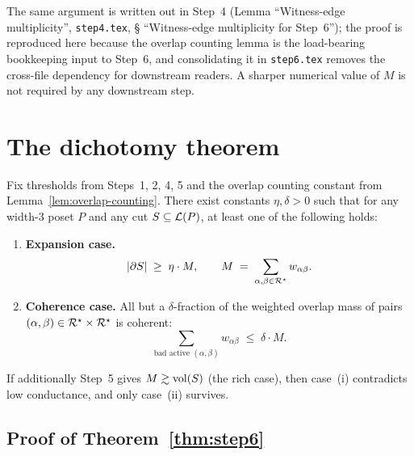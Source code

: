 \begin{remark}
The same argument is written out in Step~4
(Lemma ``Witness-edge multiplicity'', \texttt{step4.tex}, \S
``Witness-edge multiplicity for Step~6''); the proof is reproduced
here because the overlap counting lemma is the load-bearing bookkeeping
input to Step~6, and consolidating it in \texttt{step6.tex} removes the
cross-file dependency for downstream readers.  A sharper numerical
value of $M$ is not required by any downstream step.
\end{remark}

\section{The dichotomy theorem}\label{sec:dichotomy-theorem}

\begin{theorem}\label{thm:step6}
Fix thresholds from Steps~1, 2, 4, 5 and the overlap counting constant
from Lemma~\ref{lem:overlap-counting}.
There exist constants $\eta,\delta>0$ such that for any width-3 poset
$P$ and any cut $S\subseteq\mathcal{L}(P)$, at least one of the following holds:

\begin{enumerate}[label=(\roman*)]
  \item \textbf{Expansion case.}
  \[
    |\partial S| \;\ge\; \eta\cdot M,
    \qquad
    M \;=\; \sum_{\alpha,\beta\in\mathcal{R}^\star} w_{\alpha\beta}.
  \]

  \item \textbf{Coherence case.}
  All but a $\delta$-fraction of the weighted overlap mass of pairs
  $(\alpha,\beta)\in\mathcal{R}^\star\times\mathcal{R}^\star$ is coherent:
  \[
    \sum_{\text{bad active }(\alpha,\beta)} w_{\alpha\beta}
    \;\le\;
    \delta\cdot M.
  \]
\end{enumerate}

If additionally Step~5 gives $M\gtrsim\operatorname{vol}(S)$ (the rich case), then
case~(i) contradicts low conductance, and only case~(ii) survives.
\end{theorem}

\subsection{Proof of Theorem~\ref{thm:step6}}\label{sec:proof-dichotomy}

